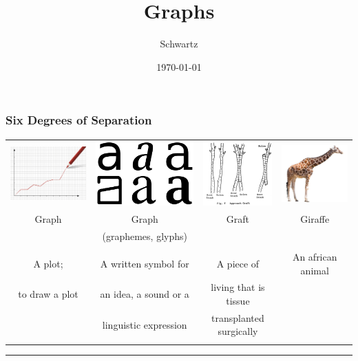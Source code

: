 \documentclass[xcolor={dvipsnames}]{beamer}
\title{Graphs}
\author{Schwartz}
\date{\today}
\begin{document}
\frame{\titlepage}

\frame
{
\frametitle{Six Degrees of Separation}


\hspace*{-2em}
\tiny
\begin{tabular}{cccc}
\includegraphics[height=.8in]{stuff/line_graph.png} &
\includegraphics[height=.8in]{stuff/1200px-A-small_glyphs.png} &
\includegraphics[height=.8in]{stuff/GraftV_11-92.png}& 
\includegraphics[height=.8in]{stuff/Giraffe_On_White_Background_600.jpg} \\
Graph & Graph & Graft & Giraffe \\
 & (graphemes, glyphs) &  &  \\
\\
 A plot; & A written symbol for              & A piece of    & An african animal\\
to draw a plot & an idea, a sound or a &  living that is tissue\\
                        &  linguistic expression & transplanted surgically \\
                        \\
\end{tabular}

\rule{\textwidth}{1pt}

}
\end{document}

